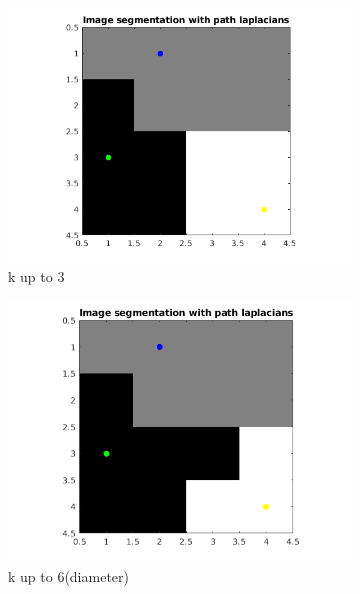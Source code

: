 \documentclass[10pt,a4paper]{article}
\begin{document}
\begin{figure}[H]
\begin{subfigure}[b]{0.45\textwidth}
    	\includegraphics[width=\textwidth]{segmentation-images/4by4longrange3-s2.png}
    	\caption{k up to 3}
    \end{subfigure}
    \begin{subfigure}[b]{0.45\textwidth}
    	\includegraphics[width=\textwidth]{segmentation-images/4by4longrange6-s2.png}
    	\caption{k up to 6(diameter)}
    \end{subfigure}\\
    \begin{subfigure}[b]{0.45\textwidth}

\end{subfigure}
\end{figure}
\end{document}
